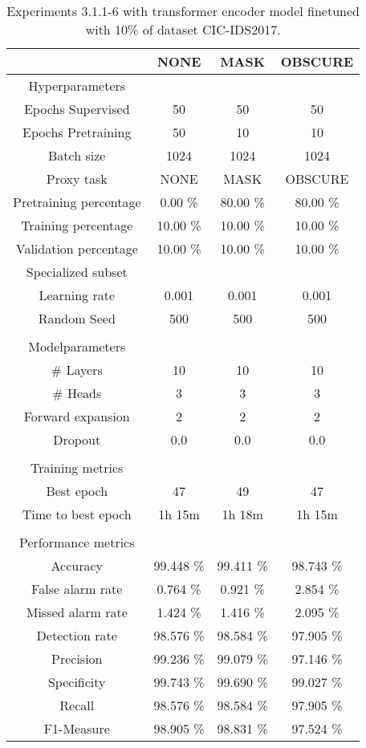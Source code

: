 \begin{table}[htb]
    \centering
    \begin{tabular}{@{}cccc@{}}
        \toprule
         &  NONE &  MASK &  OBSCURE \\
        \midrule
        Hyperparameters &  &  &  \\
        Epochs Supervised &  50 &  50 &  50 \\
        Epochs Pretraining &  50 &  10 &  10 \\
        Batch size &  1024 &  1024 &  1024 \\
        Proxy task &  NONE &  MASK &  OBSCURE \\
        Pretraining percentage &  0.00 \% &  80.00 \% &  80.00 \% \\
        Training percentage &  10.00 \% &  10.00 \% &  10.00 \% \\
        Validation percentage &  10.00 \% &  10.00 \% &  10.00 \% \\
        Specialized subset &   &   &   \\
        Learning rate &  0.001 &  0.001 &  0.001 \\
        Random Seed &  500 &  500 &  500 \\
         \\
        Modelparameters &  &  &  \\
        \# Layers &  10 &  10 &  10 \\
        \# Heads &  3 &  3 &  3 \\
        Forward expansion &  2 &  2 &  2 \\
        Dropout &  0.0 &  0.0 &  0.0 \\
         \\
        Training metrics &  &  &  \\
        Best epoch &  47 &  49 &  47 \\
        Time to best epoch &  1h 15m &  1h 18m &  1h 15m \\
         \\
        Performance metrics &  &  &  \\
        Accuracy &  99.448 \% &  99.411 \% &  98.743 \% \\
        False alarm rate &  0.764 \% &  0.921 \% &  2.854 \% \\
        Missed alarm rate &  1.424 \% &  1.416 \% &  2.095 \% \\
        Detection rate &  98.576 \% &  98.584 \% &  97.905 \% \\
        Precision &  99.236 \% &  99.079 \% &  97.146 \% \\
        Specificity &  99.743 \% &  99.690 \% &  99.027 \% \\
        Recall &  98.576 \% &  98.584 \% &  97.905 \% \\
        F1-Measure &  98.905 \% &  98.831 \% &  97.524 \% \\
        \bottomrule
    \end{tabular}
    \caption{Experiments 3.1.1-6 with transformer encoder model finetuned with 10\% of dataset CIC-IDS2017.}
    \label{table:results:lstm:stats_flows10}
\end{table}